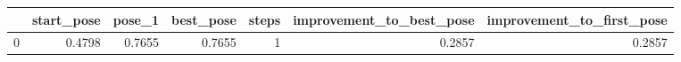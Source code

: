 \begin{tabular}{lrrrrrr}
\toprule
{} &  start\_pose &  pose\_1 &  best\_pose &  steps &  improvement\_to\_best\_pose &  improvement\_to\_first\_pose \\
\midrule
0 &      0.4798 &  0.7655 &     0.7655 &      1 &                    0.2857 &                     0.2857 \\
\bottomrule
\end{tabular}
